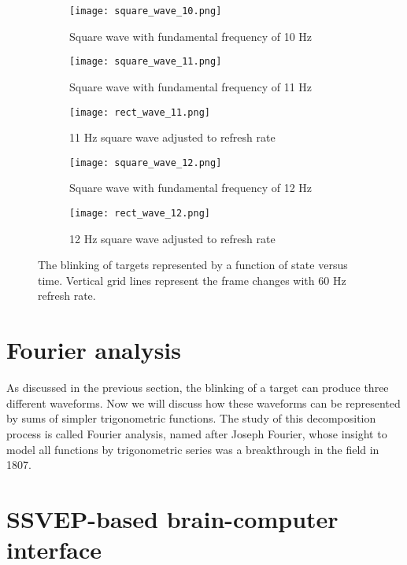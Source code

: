 \begin{figure}[h!]
	\centering
	\begin{subfigure}{\textwidth}
		\texttt{[image: square\_wave\_10.png]}
		\caption{Square wave with fundamental frequency of 10 Hz}
		\label{fig:square_10}
	\end{subfigure}\vspace{10pt}
	\begin{subfigure}{\textwidth}
		\texttt{[image: square\_wave\_11.png]}
		\caption{Square wave with fundamental frequency of 11 Hz}
		\label{fig:square_11}
	\end{subfigure}\vspace{10pt}
	\begin{subfigure}{\textwidth}
		\texttt{[image: rect\_wave\_11.png]}
		\caption{11 Hz square wave adjusted to refresh rate}
		\label{fig:rect_11}
	\end{subfigure}\vspace{10pt}
	\begin{subfigure}{\textwidth}
		\texttt{[image: square\_wave\_12.png]}
		\caption{Square wave with fundamental frequency of 12 Hz}
		\label{fig:square_12}
	\end{subfigure}\vspace{10pt}
	\begin{subfigure}{\textwidth}
		\texttt{[image: rect\_wave\_12.png]}
		\caption{12 Hz square wave adjusted to refresh rate}
		\label{fig:rect_12}
	\end{subfigure}
	\caption{The blinking of targets represented by a function of state versus time. Vertical grid lines represent the frame changes with 60 Hz refresh rate.}
	\label{fig:square_waves}
\end{figure}

\section{Fourier analysis}

As discussed in the previous section, the blinking of a target can produce three different waveforms. Now we will discuss how these waveforms can be represented by sums of simpler trigonometric functions. The study of this decomposition process is called Fourier analysis, named after Joseph Fourier, whose insight to model all functions by trigonometric series was a breakthrough in the field in 1807.

\section{SSVEP-based brain-computer interface}
\label{sec:SSVEP_detection}

